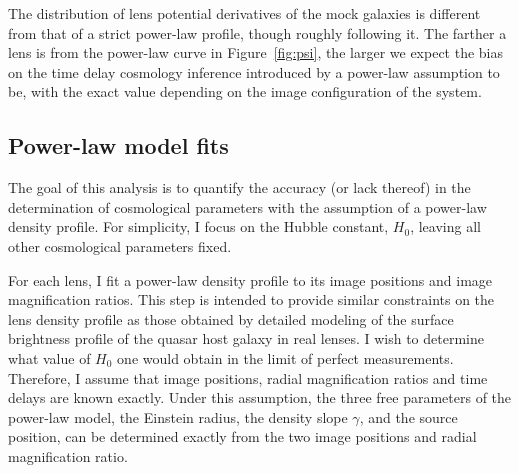 \documentclass[usenatbib]{mnras}
\def\Fref#1{Figure~\ref{#1}\xspace}
\begin{document}
%
The distribution of lens potential derivatives of the mock galaxies is different from that of a strict power-law profile, though roughly following it.
The farther a lens is from the power-law curve in \Fref{fig:psi}, the larger we expect the bias on the time delay cosmology inference introduced by a power-law assumption to be, with the exact value depending on the image configuration of the system.

\subsection{Power-law model fits}

The goal of this analysis is to quantify the accuracy (or lack thereof) in the determination of cosmological parameters with the assumption of a power-law density profile.
For simplicity, I focus on the Hubble constant, $H_0$, leaving all other cosmological parameters fixed.

For each lens, I fit a power-law density profile to its image positions and image magnification ratios. This step is intended to provide similar constraints on the lens density profile as those obtained by detailed modeling of the surface brightness profile of the quasar host galaxy in real lenses.
I wish to determine what value of $H_0$ one would obtain in the limit of perfect measurements.
Therefore, I assume that image positions, radial magnification ratios and time delays are known exactly.
Under this assumption, the three free parameters of the power-law model, the Einstein radius, the density slope $\gamma$, and the source position, can be determined exactly from the two image positions and radial magnification ratio. 
\end{document}
